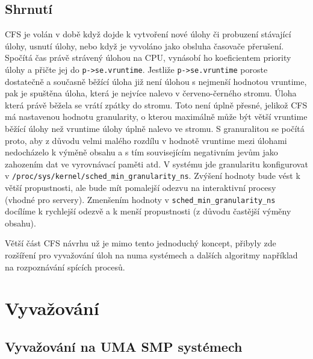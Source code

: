 \documentclass[
  field=ainfk,
  biblatex,
  glossaries,
  index
]{kidiplom}
\begin{document}
%
%
%
%
%
%

\subsection{Shrnutí}

CFS je volán v době když dojde k vytvoření nové úlohy či probuzení stávající úlohy, usnutí úlohy, nebo když je vyvoláno jako obsluha časovače přerušení. Spočítá čas právě strávený úlohou na CPU, vynásobí ho koeficientem priority úlohy a přičte jej do \verb#p->se.vruntime#. Jestliže \verb#p->se.vruntime# poroste dostatečně a současně běžící úloha již není úlohou s nejmenší hodnotou vruntime, pak je spuštěna úloha, která je nejvíce nalevo v červeno-černého stromu. Úloha která právě běžela se vrátí zpátky do stromu. Toto není úplně přesné, jelikož CFS má nastavenou hodnotu granularity, o kterou maximálně může být větší vruntime běžící úlohy než vruntime úlohy úplně nalevo ve stromu. S granuralitou se počítá proto, aby z důvodu velmi malého rozdílu v hodnotě vruntime mezi úlohami nedocházelo k výměně obsahu a s tím souvisejícím negativním jevům jako zahozením dat ve vyrovnávací paměti atd.
V systému jde granularitu konfigurovat v \verb#/proc/sys/kernel/sched_min_granularity_ns#. Zvýšení hodnoty bude vést k větší propustnosti, ale bude mít pomalejší odezvu na interaktivní procesy (vhodné pro servery). Zmenšením hodnoty  v \verb#sched_min_granularity_ns# docílíme k rychlejší odezvě a k menší propustnosti (z důvodu častější výměny obsahu).

Větší část CFS návrhu už je mimo tento jednoduchý koncept, přibyly zde rozšíření pro vyvažování úloh na numa systémech a dalších algoritmy například na rozpoznávání spících procesů.

\section{Vyvažování}

\subsection{Vyvažování na UMA SMP systémech}
\end{document}
